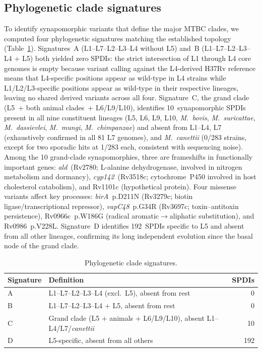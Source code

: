 \documentclass[11pt,a4paper]{article}
\begin{document}
\subsection{Phylogenetic clade signatures}
\label{sec:results:clade_sig}

To identify synapomorphic variants that define the major MTBC clades, we
computed four phylogenetic signatures matching the established topology
(Table~\ref{tab:clade_signatures}).
%
Signatures~A (L1--L7--L2--L3--L4 without L5) and~B (L1--L7--L2--L3--L4
+ L5) both yielded zero SPDIs: the strict intersection of L1 through L4
core genomes is empty because variant calling against the L4-derived H37Rv
reference means that L4-specific positions appear as wild-type in L4 strains
while L1/L2/L3-specific positions appear as wild-type in their respective
lineages, leaving no shared derived variants across all four.
%
Signature~C, the grand clade (L5~+ both animal clades~+ L6/L9/L10),
identifies 10~synapomorphic SPDIs present in all nine constituent lineages
(L5, L6, L9, L10, \textit{M.~bovis}, \textit{M.~suricattae},
\textit{M.~dassievlei}, \textit{M.~mungi}, \textit{M.~chimpanzae}) and
absent from L1--L4, L7 (exhaustively confirmed in all 81 L7 genomes),
and \textit{M.~canettii} (0/283 strains, except for two sporadic hits
at 1/283 each, consistent with sequencing noise).
%
Among the 10 grand-clade synapomorphies, three are frameshifts in
functionally important genes: \textit{ald}~(Rv2780; L-alanine
dehydrogenase, involved in nitrogen metabolism and dormancy),
\textit{cyp142}~(Rv3518c; cytochrome~P450 involved in host cholesterol
catabolism), and Rv1101c (hypothetical protein).
%
Four missense variants affect key processes: \textit{birA}~p.D211N
(Rv3279c; biotin ligase/transcriptional repressor), \textit{vapC48}~p.G34R
(Rv3697c; toxin--antitoxin persistence), Rv0966c~p.W186G (radical
aromatic$\to$aliphatic substitution), and Rv0986~p.V228L.
%
Signature~D identifies 192~SPDIs specific to L5 and absent from all other
lineages, confirming its long independent evolution since the basal node
of the grand clade.

\begin{table}[h]
\centering
\caption{Phylogenetic clade signatures.}
\label{tab:clade_signatures}
\begin{tabular}{@{}llr@{}}
\toprule
Signature & Definition & SPDIs \\
\midrule
A & L1--L7--L2--L3--L4 (excl.\ L5), absent from rest & 0 \\
B & L1--L7--L2--L3--L4 + L5, absent from rest & 0 \\
C & Grand clade (L5 + animals + L6/L9/L10), absent L1--L4/L7/\textit{canettii} & 10 \\
D & L5-specific, absent from all others & 192 \\
\bottomrule
\end{tabular}
\end{table}
\end{document}
